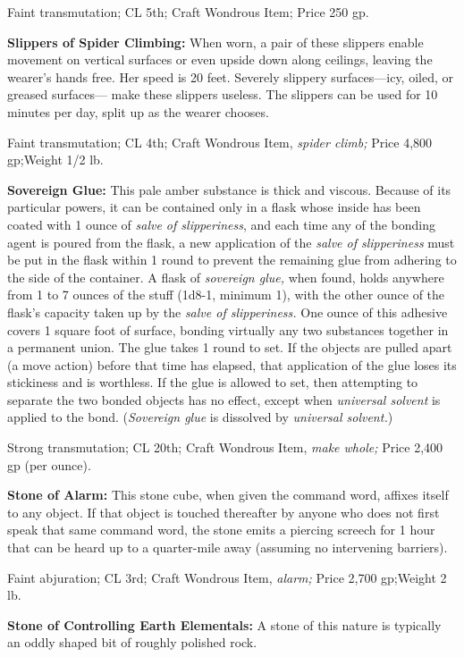 \documentclass{article}
\begin{document}
Faint transmutation; CL 5th; Craft Wondrous Item; Price 250 gp.

\textbf{Slippers of Spider Climbing:} When worn, a pair of these slippers enable 
movement on vertical surfaces or even upside down along ceilings, leaving the wearer's 
hands free. Her speed is 20 feet. Severely slippery surfaces---icy, oiled, or greased 
surfaces--- make these slippers useless. The slippers can be used for 10 minutes 
per day, split up as the wearer chooses.

Faint transmutation; CL 4th; Craft Wondrous Item, \textit{spider climb; }Price 
4,800 gp;Weight 1/2 lb.

\textbf{Sovereign Glue:} This pale amber substance is thick and viscous. Because 
of its particular powers, it can be contained only in a flask whose inside has 
been coated with 1 ounce of \textit{salve of slipperiness}, and each time any of 
the bonding agent is poured from the flask, a new application of the \textit{salve 
of slipperiness }must be put in the flask within 1 round to prevent the remaining 
glue from adhering to the side of the container. A flask of \textit{sovereign glue, 
}when found, holds anywhere from 1 to 7 ounces of the stuff (1d8-1, minimum 1), 
with the other ounce of the flask's capacity taken up by the \textit{salve of slipperiness. 
}One ounce of this adhesive covers 1 square foot of surface, bonding virtually 
any two substances together in a permanent union. The glue takes 1 round to set. 
If the objects are pulled apart (a move action) before that time has elapsed, that 
application of the glue loses its stickiness and is worthless. If the glue is allowed 
to set, then attempting to separate the two bonded objects has no effect, except 
when \textit{universal solvent }is applied to the bond. (\textit{Sovereign glue 
}is dissolved by \textit{universal solvent.})

Strong transmutation; CL 20th; Craft Wondrous Item, \textit{make whole; }Price 
2,400 gp (per ounce).

\textbf{Stone of Alarm:} This stone cube, when given the command word, affixes 
itself to any object. If that object is touched thereafter by anyone who does not 
first speak that same command word, the stone emits a piercing screech for 1 hour 
that can be heard up to a quarter-mile away (assuming no intervening barriers).

Faint abjuration; CL 3rd; Craft Wondrous Item, \textit{alarm; }Price 2,700 gp;Weight 
2 lb.

\textbf{Stone of Controlling Earth Elementals:} A stone of this nature is typically 
an oddly shaped bit of roughly polished rock.
\end{document}
